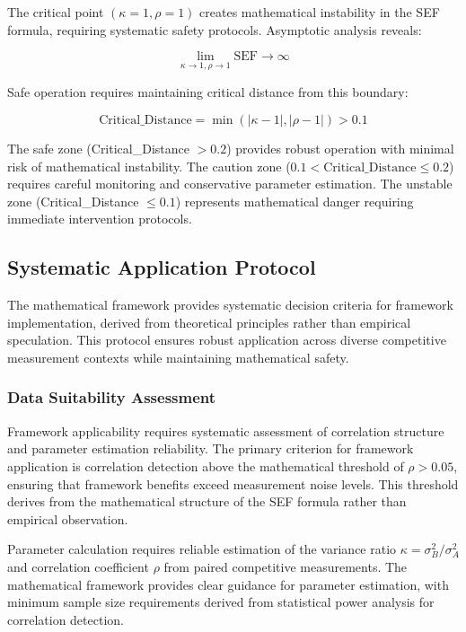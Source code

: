The critical point $(\kappa=1, \rho=1)$ creates mathematical instability in the SEF formula, requiring systematic safety protocols. Asymptotic analysis reveals:

\begin{equation}
\lim_{\kappa \to 1, \rho \to 1} \text{SEF} \to \infty
\end{equation}

Safe operation requires maintaining critical distance from this boundary:

\begin{equation}
\text{Critical\_Distance} = \min(|\kappa - 1|, |\rho - 1|) > 0.1
\end{equation}

The safe zone (Critical\_Distance $> 0.2$) provides robust operation with minimal risk of mathematical instability. The caution zone ($0.1 < \text{Critical\_Distance} \leq 0.2$) requires careful monitoring and conservative parameter estimation. The unstable zone (Critical\_Distance $\leq 0.1$) represents mathematical danger requiring immediate intervention protocols.

\subsection{Systematic Application Protocol}

The mathematical framework provides systematic decision criteria for framework implementation, derived from theoretical principles rather than empirical speculation. This protocol ensures robust application across diverse competitive measurement contexts while maintaining mathematical safety.

\subsubsection{Data Suitability Assessment}

Framework applicability requires systematic assessment of correlation structure and parameter estimation reliability. The primary criterion for framework application is correlation detection above the mathematical threshold of $\rho > 0.05$, ensuring that framework benefits exceed measurement noise levels. This threshold derives from the mathematical structure of the SEF formula rather than empirical observation.

Parameter calculation requires reliable estimation of the variance ratio $\kappa = \sigma_B^2/\sigma_A^2$ and correlation coefficient $\rho$ from paired competitive measurements. The mathematical framework provides clear guidance for parameter estimation, with minimum sample size requirements derived from statistical power analysis for correlation detection.


